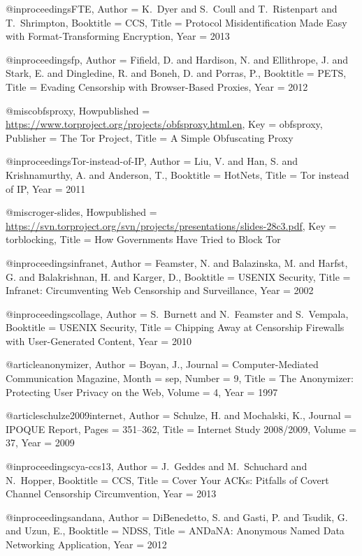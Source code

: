 {{{{{{{{{@inproceedings{FTE,
	Author = {K.~Dyer and S.~Coull and T.~Ristenpart and T.~Shrimpton},
	Booktitle = {CCS},
	Title = {{Protocol Misidentification Made Easy with Format-Transforming Encryption}},
	Year = {2013}}

@inproceedings{fp,
	Author = {Fifield, D. and Hardison, N. and Ellithrope, J. and Stark, E. and Dingledine, R. and Boneh, D. and Porras, P.},
	Booktitle = {PETS},
	Title = {{Evading Censorship with Browser-Based Proxies}},
	Year = {2012}}

@misc{obfsproxy,
	Howpublished = {\url{https://www.torproject.org/projects/obfsproxy.html.en}},
	Key = {obfsproxy},
	Publisher = {The Tor Project},
	Title = {{A Simple Obfuscating Proxy}}}

@inproceedings{Tor-instead-of-IP,
	Author = {Liu, V. and Han, S. and Krishnamurthy, A. and Anderson, T.},
	Booktitle = {HotNets},
	Title = {{Tor instead of IP}},
	Year = {2011}}

@misc{roger-slides,
	Howpublished = {\url{https://svn.torproject.org/svn/projects/presentations/slides-28c3.pdf}},
	Key = {torblocking},
	Title = {{How Governments Have Tried to Block Tor}}}

@inproceedings{infranet,
	Author = {Feamster, N. and Balazinska, M. and Harfst, G. and Balakrishnan, H. and Karger, D.},
	Booktitle = {USENIX Security},
	Title = {{Infranet: Circumventing Web Censorship and Surveillance}},
	Year = {2002}}

@inproceedings{collage,
	Author = {S.~Burnett and N.~Feamster and S.~Vempala},
	Booktitle = {USENIX Security},
	Title = {{Chipping Away at Censorship Firewalls with User-Generated Content}},
	Year = {2010}}

@article{anonymizer,
	Author = {Boyan, J.},
	Journal = {Computer-Mediated Communication Magazine},
	Month = sep,
	Number = {9},
	Title = {{The Anonymizer: Protecting User Privacy on the Web}},
	Volume = {4},
	Year = {1997}}

@article{schulze2009internet,
	Author = {Schulze, H. and Mochalski, K.},
	Journal = {IPOQUE Report},
	Pages = {351--362},
	Title = {Internet Study 2008/2009},
	Volume = {37},
	Year = {2009}}

@inproceedings{cya-ccs13,
	Author = {J.~Geddes and M.~Schuchard and N.~Hopper},
	Booktitle = {{CCS}},
	Title = {{Cover Your ACKs: Pitfalls of Covert Channel Censorship Circumvention}},
	Year = {2013}}

@inproceedings{andana,
	Author = {DiBenedetto, S. and Gasti, P. and Tsudik, G. and Uzun, E.},
	Booktitle = {{NDSS}},
	Title = {{ANDaNA: Anonymous Named Data Networking Application}},
	Year = {2012}}

}}}}}}}}}
